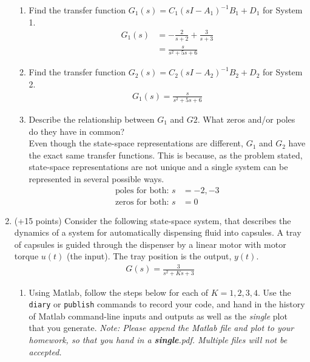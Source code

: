 \documentclass[11pt]{article}
\begin{document}
\begin{enumerate}
\begin{figure}[h!]
    \end{figure}
    \begin{enumerate}
        \item Find the transfer function \(G_1(s)=C_1{(sI-A_1)}^{-1}B_1+D_1\) for System 1.
        \begin{align*}
            G_1(s)&=-\frac{2}{s+2}+\frac{3}{s+3}\\[0.75em]
            &=\frac{s}{s^2+5s+6}
        \end{align*}
        \item Find the transfer function \(G_2(s)=C_2{(sI-A_2)}^{-1}B_2+D_2\) for System 2.
        \begin{align*}
            G_1(s)=\frac{s}{s^2+5s+6}
        \end{align*}
        \item Describe the relationship between \(G_1\) and \(G2\).  What zeros and/or poles do they have in common?\\[1em]
        Even though the state-space representations are different, \(G_1\) and \(G_2\) have the exact same transfer functions. This is because, as the problem stated, state-space representations are not unique and a single system can be represented in several possible ways.
        \begin{align*}
            \text{poles for both: }s&=-2,-3\\
            \text{zeros for both: }s&=0
        \end{align*}
    \end{enumerate}
    \item (+15  points) Consider the following state-space system, that describes the dynamics of a system for automatically dispensing fluid into capsules. A tray of capsules is guided through the dispenser by a linear motor with motor torque \(u(t)\) (the input). The tray position is the output, \(y(t)\).
    \begin{align}
        G(s)=\frac{3}{s^2+Ks+3}
    \end{align}
    \begin{enumerate}
        \item Using Matlab, follow the steps below for each of \(K= 1,2,3,4\). Use the \texttt{diary} or \texttt{publish} commands to record your code, and hand in the history of Matlab command-line inputs and outputs as well as the \textit{single} plot that you generate. \textit{Note: Please append the Matlab file and plot to your homework, so that you hand in a \textbf{single}.pdf. Multiple files will not be accepted.}

\end{enumerate}
\end{enumerate}
\end{document}
